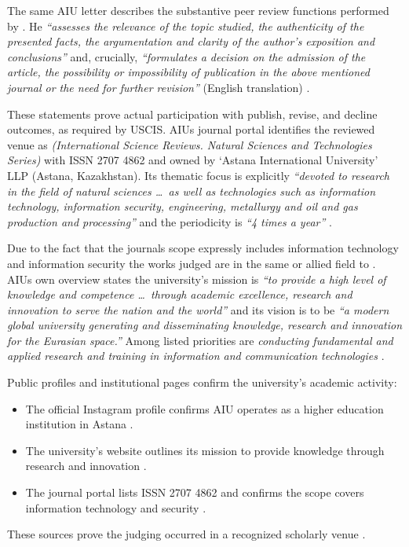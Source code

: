 The same AIU letter describes the substantive peer review functions performed by \mrl{}. He \emph{``assesses the relevance of the topic studied, the authenticity of the presented facts, the argumentation and clarity of the author’s exposition and conclusions''} and, crucially, \emph{``formulates a decision on the admission of the article, the possibility or impossibility of publication in the above mentioned journal or the need for further revision''} (English translation) .

These statements prove actual participation with publish, revise, and decline outcomes, as required by USCIS. AIUs journal portal identifies the reviewed venue as \emph{(International Science Reviews. Natural Sciences and Technologies Series)} with ISSN 2707 4862 and owned by `Astana International University’ LLP (Astana, Kazakhstan). Its thematic focus is explicitly \emph{``devoted to research in the field of natural sciences \dots\ as well as technologies such as information technology, information security, engineering, metallurgy and oil and gas production and processing''} and the periodicity is \emph{``4 times a year''} .

Due to the fact that the journals scope expressly includes information technology and information security the works judged are in the same or allied field to \fie. AIUs own overview states the university’s mission is \emph{``to provide a high level of knowledge and competence \dots\ through academic excellence, research and innovation to serve the nation and the world''} and its vision is to be \emph{``a modern global university generating and disseminating knowledge, research and innovation for the Eurasian space.''} Among listed priorities are \emph{conducting fundamental and applied research and training in information and communication technologies} .

Public profiles and institutional pages confirm the university’s academic activity:
\vspace{-0.5\baselineskip}
\begin{itemize}[nosep]
\item The official Instagram profile confirms AIU operates as a higher education institution in Astana .
\item The university’s website outlines its mission to provide knowledge through research and innovation .
\item The journal portal lists ISSN 2707 4862 and confirms the scope covers information technology and security .
\end{itemize}
These sources prove the judging occurred in a recognized scholarly venue .


